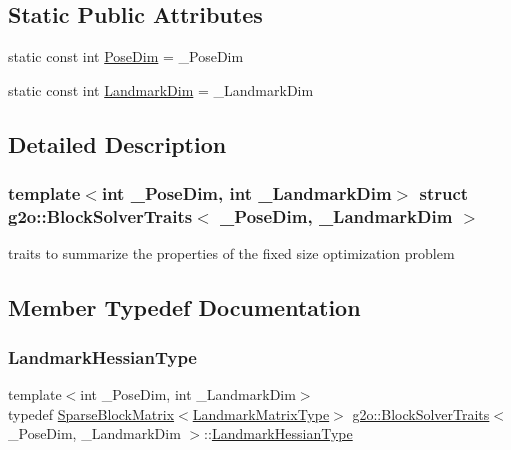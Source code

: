 \subsection*{Static Public Attributes}
\begin{DoxyCompactItemize}
\item 
static const int \mbox{\hyperlink{structg2o_1_1_block_solver_traits_a90a03bcfc60b629da5601f6df9514297}{Pose\+Dim}} = \+\_\+\+Pose\+Dim
\item 
static const int \mbox{\hyperlink{structg2o_1_1_block_solver_traits_a7e6e33971e5243e020a9f41cd3182218}{Landmark\+Dim}} = \+\_\+\+Landmark\+Dim
\end{DoxyCompactItemize}


\subsection{Detailed Description}
\subsubsection*{template$<$int \+\_\+\+Pose\+Dim, int \+\_\+\+Landmark\+Dim$>$\newline
struct g2o\+::\+Block\+Solver\+Traits$<$ \+\_\+\+Pose\+Dim, \+\_\+\+Landmark\+Dim $>$}

traits to summarize the properties of the fixed size optimization problem 

\subsection{Member Typedef Documentation}
\mbox{\label{structg2o_1_1_block_solver_traits_ae761bb32d5267e4d74e5d9c2c7e7ad2f}} 
\subsubsection{\texorpdfstring{Landmark\+Hessian\+Type}{LandmarkHessianType}}
{\footnotesize\ttfamily template$<$int \+\_\+\+Pose\+Dim, int \+\_\+\+Landmark\+Dim$>$ \\
typedef \mbox{\hyperlink{classg2o_1_1_sparse_block_matrix}{Sparse\+Block\+Matrix}}$<$\mbox{\hyperlink{structg2o_1_1_block_solver_traits_add9b9fbfef352b7654d41914d5eaa58c}{Landmark\+Matrix\+Type}}$>$ \mbox{\hyperlink{structg2o_1_1_block_solver_traits}{g2o\+::\+Block\+Solver\+Traits}}$<$ \+\_\+\+Pose\+Dim, \+\_\+\+Landmark\+Dim $>$\+::\mbox{\hyperlink{structg2o_1_1_block_solver_traits_ae761bb32d5267e4d74e5d9c2c7e7ad2f}{Landmark\+Hessian\+Type}}}


